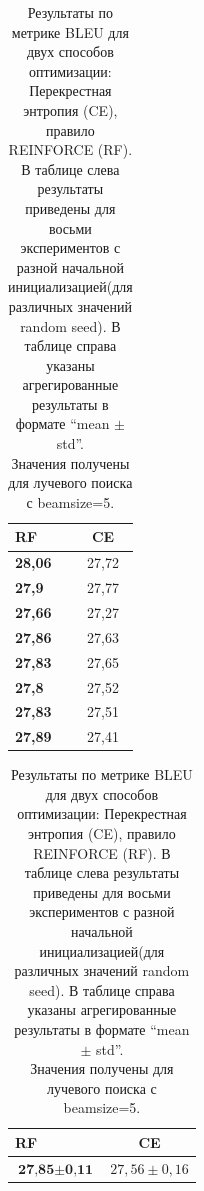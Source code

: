 \documentclass[14pt, a4paper]{extarticle}
\begin{document}
\begin{table}[!htbp]
\begin{tabular}{|l  c |}
  \hline
  \bf RF & \bf CE \\
  \hline
  \bf 28,06 & 27,72 \\
  \bf 27,9  & 27,77 \\
  \bf 27,66 & 27,27 \\
  \bf 27,86 & 27,63 \\
  \bf 27,83 & 27,65 \\
  \bf 27,8  & 27,52 \\
  \bf 27,83 & 27,51 \\
  \bf 27,89 & 27,41 \\
  \hline
\end{tabular}
\quad \quad \quad \quad \quad \quad \quad \quad \quad \quad \quad
\begin{tabular}{| l  c |}
  \hline \bf RF & \bf CE \\
  \hline
  $\textbf{27,85}\pm \textbf{0,11}$ & $27,56\pm 0,16$ \\
  \hline
\end{tabular}
\caption{Результаты по метрике BLEU для двух способов оптимизации: Перекрестная энтропия (CE), правило REINFORCE (RF).
В таблице слева результаты приведены для восьми экспериментов с разной начальной инициализацией(для различных значений random seed).
В таблице справа указаны агрегированные результаты в формате ``mean $\pm$ std''.\\
Значения получены для лучевого поиска с beamsize=5.}
\end{table}
\end{document}
